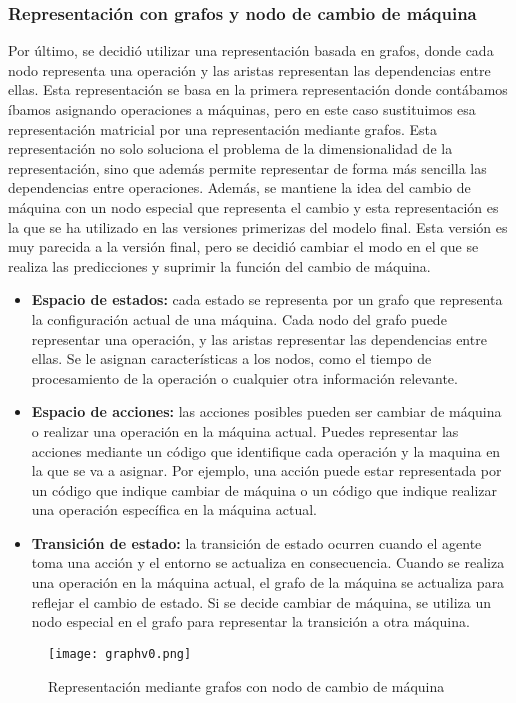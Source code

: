 \subsubsection{Representación con grafos y nodo de cambio de máquina}
Por último, se decidió utilizar una representación basada en grafos, donde cada nodo
representa una operación y las aristas representan las dependencias entre ellas. Esta
representación se basa en la primera representación donde contábamos íbamos asignando
operaciones a máquinas, pero en este caso sustituimos esa representación matricial por
una representación mediante grafos. Esta representación no solo soluciona el problema
de la dimensionalidad de la representación, sino que además permite representar de
forma más sencilla las dependencias entre operaciones. Además, se mantiene la idea del
cambio de máquina con un nodo especial que representa el cambio y esta representación
es la que se ha utilizado en las versiones primerizas del modelo final. Esta versión
es muy parecida a la versión final, pero se decidió cambiar el modo en el que se realiza
las predicciones y suprimir la función del cambio de máquina.

\begin{itemize}
    \item \textbf{Espacio de estados:} cada estado se representa por un grafo 
    que representa la configuración actual de una máquina. Cada nodo del grafo puede representar 
    una operación, y las aristas representar las dependencias entre ellas. Se le asignan
    características a los nodos, como el tiempo de procesamiento de la operación o cualquier 
    otra información relevante.
    \item \textbf{Espacio de acciones:} las acciones posibles pueden ser cambiar de máquina 
    o realizar una operación en la máquina actual. Puedes representar las acciones mediante 
    un código que identifique cada operación y la maquina en la que se va a asignar. Por 
    ejemplo, una acción puede estar representada por un código que indique cambiar de máquina o 
    un código que indique realizar una operación específica en la máquina actual.
    \item \textbf{Transición de estado:} la transición de estado ocurren cuando el agente 
    toma una acción y el entorno se actualiza en consecuencia. Cuando se realiza una operación 
    en la máquina actual, el grafo de la máquina se actualiza para reflejar el cambio de estado. 
    Si se decide cambiar de máquina, se utiliza un nodo especial en el grafo para representar 
    la transición a otra máquina.
\end{itemize}
\begin{figure}[ht]
    \centering
    \texttt{[image: graphv0.png]}
    \caption{Representación mediante grafos con nodo de cambio de máquina}
    \label{fig:rep-graph-v0}
\end{figure}
